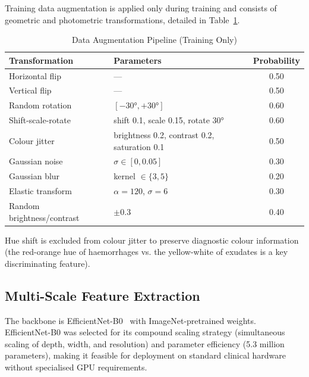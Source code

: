 \documentclass[review,12pt]{elsarticle}
\begin{document}
Training data augmentation is applied only during training and consists of
geometric and photometric transformations, detailed in
Table~\ref{tab:augmentation}.

\begin{table}[htbp]
\caption{Data Augmentation Pipeline (Training Only)}
\label{tab:augmentation}
\centering
\begin{threeparttable}
\begin{tabular}{llc}
\toprule
\textbf{Transformation} & \textbf{Parameters} & \textbf{Probability} \\
\midrule
Horizontal flip       & ---                                   & 0.50 \\
Vertical flip         & ---                                   & 0.50 \\
Random rotation       & $[-30°, +30°]$                        & 0.60 \\
Shift-scale-rotate    & shift 0.1, scale 0.15, rotate 30°     & 0.60 \\
Colour jitter\tnote{a} & brightness 0.2, contrast 0.2, saturation 0.1 & 0.50 \\
Gaussian noise        & $\sigma \in [0, 0.05]$                & 0.30 \\
Gaussian blur         & kernel $\in \{3, 5\}$                 & 0.20 \\
Elastic transform     & $\alpha = 120$, $\sigma = 6$          & 0.30 \\
Random brightness/contrast & $\pm 0.3$                        & 0.40 \\
\bottomrule
\end{tabular}
\begin{tablenotes}
\small
\item[a] Hue shift is excluded from colour jitter to preserve diagnostic
colour information (the red-orange hue of haemorrhages vs. the yellow-white
of exudates is a key discriminating feature).
\end{tablenotes}
\end{threeparttable}
\end{table}

\subsection{Multi-Scale Feature Extraction}

The backbone is EfficientNet-B0~\cite{tan2019} with ImageNet-pretrained weights.
EfficientNet-B0 was selected for its compound scaling strategy (simultaneous
scaling of depth, width, and resolution) and parameter efficiency (5.3 million
parameters), making it feasible for deployment on standard clinical hardware
without specialised GPU requirements.
\end{document}
